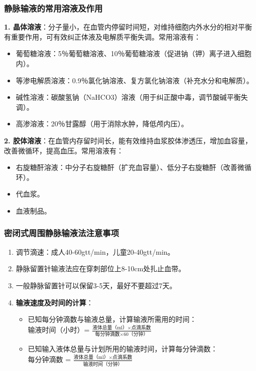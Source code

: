 \documentclass[11pt, a4paper]{ctexart}
\begin{document}
\subsubsection{静脉输液的常用溶液及作用}
\textbf{1. 晶体溶液}：分子量小，在血管内停留时间短，对维持细胞内外水分的相对平衡有重要作用，可有效纠正体液及电解质平衡失调。常用溶液有：
\begin{itemize}
	\item 葡萄糖溶液：5％葡萄糖溶液、10％葡萄糖溶液（促进钠（钾）离子进入细胞内）。
	\item 等渗电解质溶液：0.9％氯化钠溶液、复方氯化钠溶液（补充水分和电解质）。
	\item 碱性溶液：碳酸氢钠（NaHCO3）溶液（用于纠正酸中毒，调节酸碱平衡失调）。
	\item 高渗溶液：20％甘露醇（用于消除水肿，降低颅内压）。
\end{itemize}

\textbf{2. 胶体溶液}：在血管内存留时间长，能有效维持血浆胶体渗透压，增加血容量，改善微循环，提高血压。常用溶液有：
\begin{itemize}
	\item 右旋糖酐溶液：中分子右旋糖酐（扩充血容量）、低分子右旋糖酐（改善微循环）。
	\item 代血浆。
	\item 血液制品。
\end{itemize}

\subsubsection{密闭式周围静脉输液法注意事项}
\begin{enumerate}
	\item 调节滴速：成人40-60gtt/min，儿童20-40gtt/min。
	\item 静脉留置针输液法应在穿刺部位上8-10cm处扎止血带。
	\item 一般静脉留置针可以保留3-5天，最好不要超过7天。
	\item \textbf{输液速度及时间的计算}：
	      \begin{itemize}
		      \item 已知每分钟滴数与输液总量，计算输液所需用的时间：\\
		            输液时间（小时）= $\frac{\text{液体总量（ml）×点滴系数}}{\text{每分钟滴数×60（分钟）}}$
		      \item 已知输入液体总量与计划所用的输液时间，计算每分钟滴数：\\
		            每分钟滴数 = $\frac{\text{液体总量（ml）×点滴系数}}{\text{输液时间（分钟）}}$
	      \end{itemize}
\end{enumerate}
\end{document}
